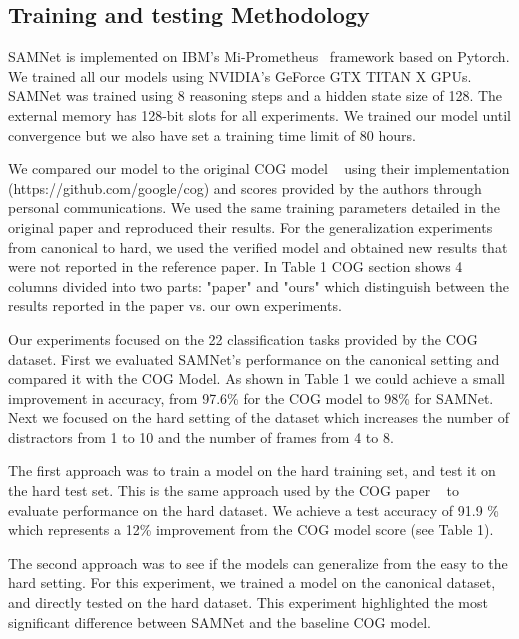 \subsection{Training and testing Methodology}

SAMNet is implemented on IBM's Mi-Prometheus~\cite{kornuta2018accelerating} framework based on Pytorch. 
We trained all our models using NVIDIA’s GeForce GTX TITAN X GPUs. SAMNet was trained using 8 reasoning steps and a hidden state size of 128. The external memory has 128-bit slots for all experiments. We trained our model until convergence but we also have set a training time limit of 80 hours.

We compared our model to the original COG model  ~\cite{yang2018dataset} using their implementation (https://github.com/google/cog) and scores provided by the authors through personal communications. We used the same training parameters detailed in the original paper and reproduced their results.  For the generalization experiments from canonical to hard, we used the verified model and obtained new results that were not reported in the reference paper.   In Table 1 COG section shows 4 columns divided into two parts: "paper" and "ours" which distinguish between the results reported in the paper vs. our own experiments.

Our experiments focused on the 22 classification tasks provided by the COG dataset.  First we evaluated SAMNet's performance on the canonical setting and compared it with the COG Model. As shown in Table 1 we could achieve a small improvement in accuracy, from 97.6\% for the COG model to 98\% for SAMNet. Next we focused on the hard setting of the dataset which increases the number of distractors from 1 to 10 and the number of frames from 4 to 8.

The first approach was to train a model on the hard training set, and test it on the hard test set. This is the same approach used by the COG paper ~\cite{yang2018dataset} to evaluate performance on the hard dataset. We achieve a test accuracy of 91.9 \% which represents a 12\% improvement from the COG model score (see Table 1).

The second approach was to see if the models can generalize from the easy to the hard setting. For this experiment, we trained a model on the canonical dataset, and directly tested on the hard dataset.  This experiment highlighted the most significant difference between SAMNet and the baseline COG model.

